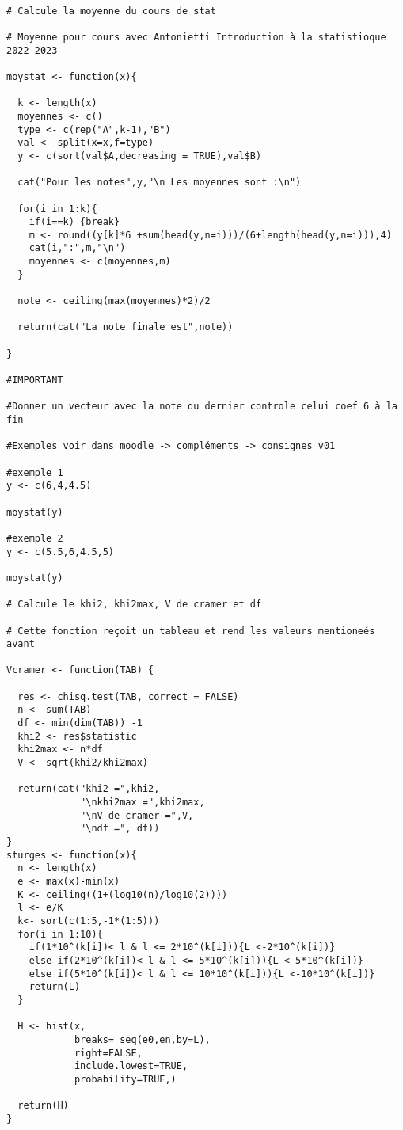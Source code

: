 \documentclass{report}
\begin{document}
\begin{verbatim}

# Calcule la moyenne du cours de stat 

# Moyenne pour cours avec Antonietti Introduction à la statistioque 2022-2023

moystat <- function(x){ 
  
  k <- length(x)
  moyennes <- c()
  type <- c(rep("A",k-1),"B")
  val <- split(x=x,f=type)
  y <- c(sort(val$A,decreasing = TRUE),val$B)
  
  cat("Pour les notes",y,"\n Les moyennes sont :\n")
  
  for(i in 1:k){ 
    if(i==k) {break}
    m <- round((y[k]*6 +sum(head(y,n=i)))/(6+length(head(y,n=i))),4)
    cat(i,":",m,"\n")
    moyennes <- c(moyennes,m)
  }
  
  note <- ceiling(max(moyennes)*2)/2
  
  return(cat("La note finale est",note))
  
}

#IMPORTANT

#Donner un vecteur avec la note du dernier controle celui coef 6 à la fin 

#Exemples voir dans moodle -> compléments -> consignes v01

#exemple 1
y <- c(6,4,4.5)

moystat(y)

#exemple 2
y <- c(5.5,6,4.5,5)

moystat(y)

# Calcule le khi2, khi2max, V de cramer et df 

# Cette fonction reçoit un tableau et rend les valeurs mentioneés avant

Vcramer <- function(TAB) {
  
  res <- chisq.test(TAB, correct = FALSE)
  n <- sum(TAB)
  df <- min(dim(TAB)) -1
  khi2 <- res$statistic
  khi2max <- n*df
  V <- sqrt(khi2/khi2max)
  
  return(cat("khi2 =",khi2,
             "\nkhi2max =",khi2max, 
             "\nV de cramer =",V, 
             "\ndf =", df))
}
sturges <- function(x){ 
  n <- length(x)
  e <- max(x)-min(x)
  K <- ceiling((1+(log10(n)/log10(2))))
  l <- e/K
  k<- sort(c(1:5,-1*(1:5)))
  for(i in 1:10){
    if(1*10^(k[i])< l & l <= 2*10^(k[i])){L <-2*10^(k[i])}
    else if(2*10^(k[i])< l & l <= 5*10^(k[i])){L <-5*10^(k[i])}
    else if(5*10^(k[i])< l & l <= 10*10^(k[i])){L <-10*10^(k[i])}
    return(L)
  }
  
  H <- hist(x,
            breaks= seq(e0,en,by=L),
            right=FALSE,
            include.lowest=TRUE,
            probability=TRUE,)
  
  return(H)
}
\end{verbatim}
\end{document}
